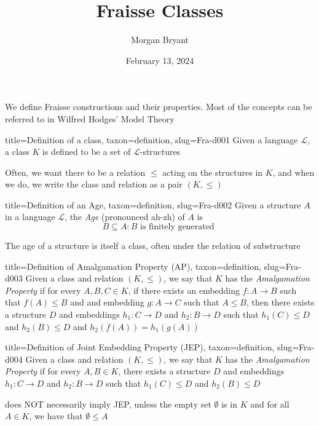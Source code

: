 \documentclass[a4paper]{article}
\title{Fraisse Classes}
\date{February 13, 2024}
\author{Morgan Bryant}
\begin{document}
\maketitle
\par{We define Fraisse constructions and their properties. Most of the concepts can be referred to in Wilfred Hodges' Model Theory~\cite{Ref-0001}}
\begin{tree}{title={Definition of a class}, taxon={definition}, slug={Fra-d001}}
Given a language \(\mathcal {L}\), a class \(K\) is defined to be a set of \(\mathcal {L}\)-structures\par{Often, we want there to be a relation \(\leq\) acting on the structures in \(K\), and when we do, we write the class and relation as a pair \((K,  \leq )\)}
\end{tree}

\begin{tree}{title={Definition of an Age}, taxon={definition}, slug={Fra-d002}}
Given a structure \(A\) in a language \(\mathcal {L}\), the \emph{Age} (pronounced ah-zh) of \(A\) is \[B \subseteq  A: B  \text { is finitely generated }\]\par{The age of a structure is itself a class, often under the relation of substructure}
\end{tree}

\begin{tree}{title={Definition of Amalgamation Property (AP)}, taxon={definition}, slug={Fra-d003}}
Given a class and relation \((K, \leq )\), we say that \(K\) has the \emph{Amalgamation Property} if for every \(A,B,C  \in  K\), if there 
exists an embedding \(f:A \rightarrow  B\) such that \(f(A)  \leq  B\) and and embedding \(g:A \rightarrow  C\) such that \(A \leq  B\), then there exists a structure \(D\) 
and embeddings \(h_1:C \rightarrow  D\) and \(h_2:B \rightarrow  D\) such that \(h_1(C) \leq  D\) and \(h_2(B)  \leq  D\) and \(h_2(f(A)) = h_1(g(A))\)
\end{tree}

\begin{tree}{title={Definition of Joint Embedding Property (JEP)}, taxon={definition}, slug={Fra-d004}}
Given a class and relation \((K, \leq )\), we say that \(K\) has the \emph{Amalgamation Property} if for every \(A,B  \in  K\), there exists a structure \(D\) 
and embeddings \(h_1:C \rightarrow  D\) and \(h_2:B \rightarrow  D\) such that \(h_1(C) \leq  D\) and \(h_2(B)  \leq  D\)\par{ does NOT necessarily imply JEP, unless the empty set \(\emptyset\) is in \(K\) and for all \(A \in  K\), we have that \(\emptyset   \leq  A\)}
\end{tree}
\end{document}
